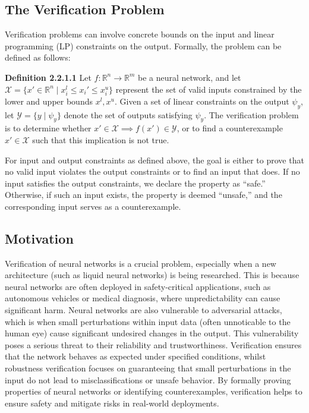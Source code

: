 \subsection*{The Verification Problem}

Verification problems can involve concrete bounds on the input and linear programming (LP) constraints on the output. Formally, the problem can be defined as follows:

\textbf{Definition 2.2.1.1} Let \( f : \mathbb{R}^n \to \mathbb{R}^m \) be a neural network, and let \( \mathcal{X} = \{x' \in \mathbb{R}^n \mid x_i^l \leq x_i' \leq x_i^u \} \) represent the set of valid inputs constrained by the lower and upper bounds \(x^l, x^u\). Given a set of linear constraints on the output \( \psi_y \), let \( \mathcal{Y} = \{ y \mid \psi_y \} \) denote the set of outputs satisfying \( \psi_y \). The verification problem is to determine whether \( x' \in \mathcal{X} \implies f(x') \in \mathcal{Y} \), or to find a counterexample \( x' \in \mathcal{X} \) such that this implication is not true. \label{verification_def}

For input and output constraints as defined above, the goal is either to prove that no valid input violates the output constraints or to find an input that does. If no input satisfies the output constraints, we declare the property as ``safe.'' Otherwise, if such an input exists, the property is deemed ``unsafe,'' and the corresponding input serves as a counterexample. \cite {henriksenEfficientNeuralNetwork}

\subsection*{Motivation}

Verification of neural networks is a crucial problem, especially when a new architecture (such as liquid neural networks) is being researched. This is because neural networks are often deployed in safety-critical applications, such as autonomous vehicles or medical diagnosis, where unpredictability can cause significant harm. Neural networks are also vulnerable to adversarial attacks, which is when small perturbations within input data (often unnoticable to the human eye) cause significant undesired changes in the output. This vulnerability poses a serious threat to their reliability and trustworthiness. Verification ensures that the network behaves as expected under specified conditions, whilst robustness verification focuses on guaranteeing that small perturbations in the input do not lead to misclassifications or unsafe behavior. By formally proving properties of neural networks or identifying counterexamples, verification helps to ensure safety and mitigate risks in real-world deployments.

